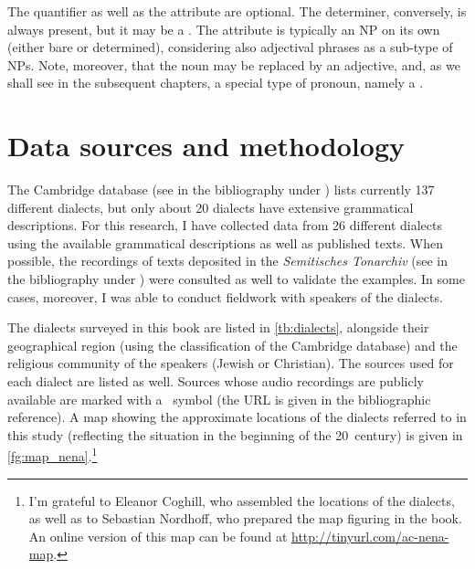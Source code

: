 The quantifier as well as the attribute are optional. The determiner, conversely, is always present, but it may be a \zero. The attribute is typically an NP on its own (either bare or determined), considering also adjectival phrases as a sub-type of NPs. Note, moreover, that the noun may be replaced by an adjective, and, as we shall see in the subsequent chapters, a special type of pronoun, namely a .  

\section{Data sources and methodology}

The Cambridge  database (see in the bibliography under \cite{NenaDatabase}) lists currently 137 different dialects, but only about 20 dialects have extensive grammatical descriptions. For this research, I have collected data from 26 different dialects using   the available grammatical descriptions as well as published texts. When possible, the recordings of texts deposited in the \textit{Semitisches Tonarchiv} (see in the bibliography under \cite{SemArch}) were consulted as well to validate the examples. In some cases, moreover, I was able to conduct fieldwork with speakers of the dialects.

The dialects surveyed in this book are listed in \vref{tb:dialects}, alongside their geographical region (using the classification of the Cambridge database) and the religious community of the speakers (Jewish or Christian). The sources used for each dialect are listed as well. Sources whose audio recordings are publicly available are marked with a \audiosign\ symbol (the URL is given in the bibliographic reference). A map showing the approximate locations of the dialects referred to in this study (reflecting the situation in the beginning of the 20\th\ century) is given in \vref{fg:map_nena}.\footnote{I'm grateful to Eleanor Coghill, who assembled the locations of the dialects, as well as to Sebastian Nordhoff, who prepared the map figuring in the book. An online version of this map can be found at \url{http://tinyurl.com/ac-nena-map}.}

